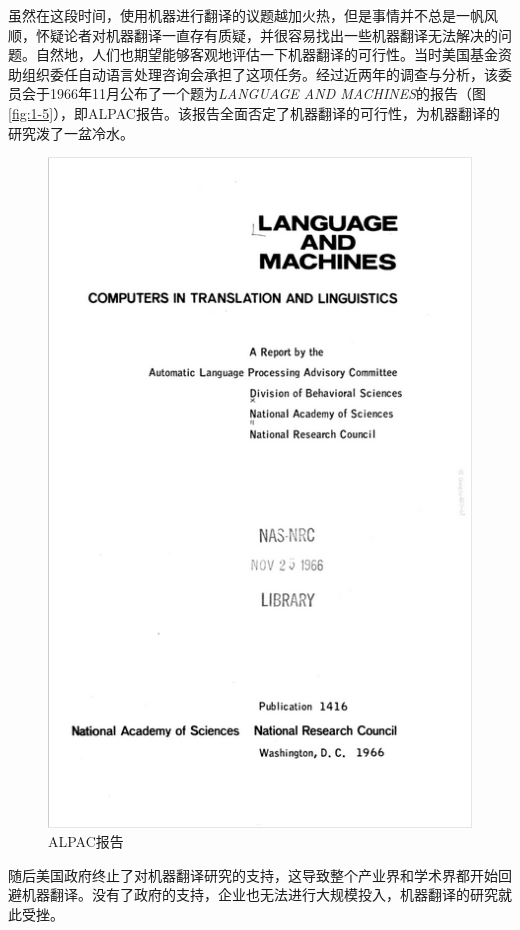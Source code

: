 \parinterval 虽然在这段时间，使用机器进行翻译的议题越加火热，但是事情并不总是一帆风顺，怀疑论者对机器翻译一直存有质疑，并很容易找出一些机器翻译无法解决的问题。自然地，人们也期望能够客观地评估一下机器翻译的可行性。当时美国基金资助组织委任自动语言处理咨询会承担了这项任务。经过近两年的调查与分析，该委员会于1966年11月公布了一个题为\emph{LANGUAGE AND MACHINES}的报告（图\ref{fig:1-5}），即ALPAC报告。该报告全面否定了机器翻译的可行性，为机器翻译的研究泼了一盆冷水。

\begin{figure}[htp]
    \centering
\includegraphics[scale=0.65]{./Chapter1/Figures/figure-report.jpg}
    \caption{ALPAC报告}
    \label{fig:1-4}
\end{figure}

\parinterval 随后美国政府终止了对机器翻译研究的支持，这导致整个产业界和学术界都开始回避机器翻译。没有了政府的支持，企业也无法进行大规模投入，机器翻译的研究就此受挫。

